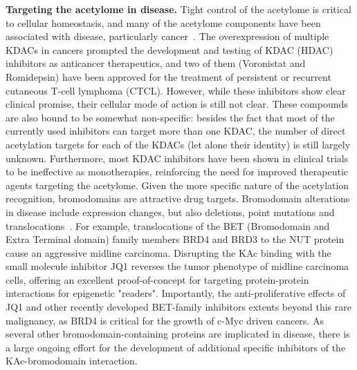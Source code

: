 \documentclass[arial,11pt]{article}
\begin{document}
{\bf Targeting the acetylome in disease.} Tight control of the acetylome is critical to cellular homeostasis, and many of the acetylome components have been associated with disease, particularly cancer~\cite{muller11}. The overexpression of multiple KDACs in cancers prompted the development and testing of KDAC (HDAC) inhibitors as anticancer therapeutics, and two of them (Voronistat and  Romidepsin) have been approved for the treatment of persistent or recurrent cutaneous T-cell lymphoma (CTCL). However, while these inhibitors show clear clinical promise, their cellular mode of action is still not clear. These compounds are also bound to be somewhat non-specific: besides the fact that most of the currently used inhibitors can target more than one KDAC, the number of direct acetylation targets for each of the KDACs (let alone their identity) is still largely unknown. Furthermore, most KDAC inhibitors have been shown in clinical trials to be ineffective as monotherapies, reinforcing the need for improved therapeutic agents targeting the acetylome. Given the more specific nature of the acetylation recognition, bromodomains are attractive drug targets. Bromodomain alterations in disease include expression changes, but also deletions, point mutations and translocations~\cite{muller11}. For example, translocations of the BET (Bromodomain and Extra Terminal domain) family members BRD4 and BRD3 to the NUT protein cause an aggressive midline carcinoma. Disrupting the KAc binding with the small molecule inhibitor JQ1 reverses the tumor phenotype of midline carcinoma cells, offering an excellent proof-of-concept for targeting protein-protein interactions for epigenetic "readers". Importantly, the anti-proliferative effects of JQ1 and other recently developed BET-family inhibitors extents beyond this rare malignancy, as BRD4 is critical for the growth of c-Myc driven cancers. As several other bromodomain-containing proteins are implicated in disease, there is a large ongoing effort for the development of additional specific inhibitors of the KAc-bromodomain interaction.
\end{document}
